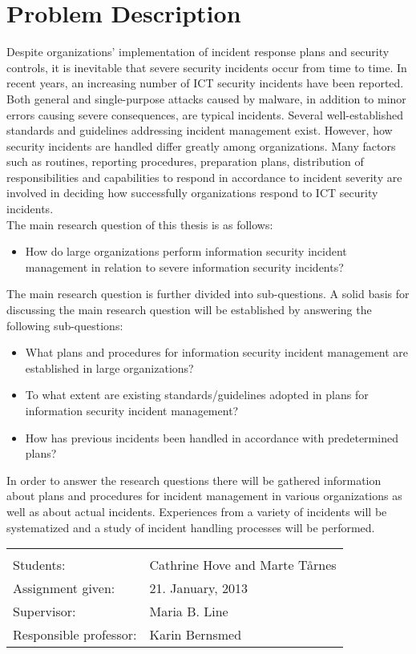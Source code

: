 \chapter*{Problem Description}
Despite organizations’ implementation of incident response plans and security controls, it is inevitable that severe security incidents occur from time to time. In recent years, an increasing number of ICT security incidents have been reported. Both general and single-purpose attacks caused by malware, in addition to minor errors causing severe consequences, are typical incidents. Several well-established standards and guidelines addressing incident management exist. However, how security incidents are handled differ greatly among organizations. Many factors such as routines, reporting procedures, preparation plans, distribution of responsibilities and capabilities to respond in accordance to incident severity are involved in deciding how successfully organizations respond to ICT security incidents. \\

The main research question of this thesis is as follows: 
\begin{itemize}
\item How do large organizations perform information security incident management in relation to severe information security incidents?\\
\end{itemize}

The main research question is further divided into sub-questions. A solid basis for discussing the main research question will be established by answering the following sub-questions:

\begin{itemize}
\item What plans and procedures for information security incident management are established in large organizations?
\item To what extent are existing standards/guidelines adopted in plans for information security incident management?
\item How has previous incidents been handled in accordance with predetermined plans? 
\end{itemize}

In order to answer the research questions there will be gathered information about plans and procedures for incident management in various organizations as well as about actual incidents. Experiences from a variety of incidents will be systematized and a study of incident handling processes will be performed.

\begin{tabular}{@{}p{4cm}l}
\vspace{0.4cm} & \vspace{0.4cm} \\
Students:		& Cathrine Hove and Marte T\aa rnes \\
Assignment given: & 21. January, 2013 \\
Supervisor:		& Maria B. Line \\
Responsible professor: 	& Karin Bernsmed \\
\end{tabular}
